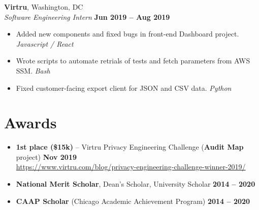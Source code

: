 \documentclass[margin]{resume}
\begin{document}
    \textcolor{blu}{\textbf{Virtru}}, Washington, DC \vspace{2mm}\\\vspace{1mm}%
    \textsl{Software Engineering Intern} \hfill \textbf{Jun 2019 -- Aug 2019}

\begin{itemize}
\item Added new components and fixed bugs in front-end Dashboard project. \hfill \textit{Javascript / React}
\item Wrote scripts to automate retrials of tests and fetch parameters from AWS SSM. \hfill \textit{Bash}
\item Fixed customer-facing export client for JSON and CSV data. \hfill \textit{Python}
\end{itemize}


    \section{\mysidestyle Awards}
    \begin{itemize}
    \item
    \textcolor{blu}{\textbf{1st place (\$15k)}} -- Virtru Privacy Engineering Challenge (\textbf {Audit Map} project) \hfill \textbf{Nov 2019} \\ \url{https://www.virtru.com/blog/privacy-engineering-challenge-winner-2019/}
    \item
\textbf{National Merit Scholar}, Dean’s Scholar, University Scholar \hfill \textbf{2014 -- 2020} %
\item
\textbf{CAAP Scholar} (Chicago Academic Achievement Program) \hfill \textbf{2014 -- 2020}
\end{itemize}
\end{document}
